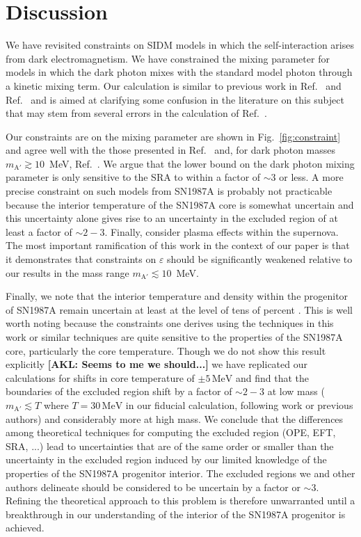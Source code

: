 \documentclass[nofootinbib,prd,superscriptaddress,twocolumn]{revtex4}
\newcommand{\akl}[1]{{{\bf{\color{Red}[AKL: #1]}}}}
\begin{document}
\section{Discussion}
\label{section:conclusions}


We have revisited constraints on SIDM models in which the 
self-interaction arises from dark electromagnetism. We have 
constrained the mixing parameter for models in which the dark photon 
mixes with the standard model photon through a kinetic mixing term. Our calculation 
is similar to previous work in Ref.~\cite{dent_etal12} and Ref.~\cite{rrapaj_reddy16} and 
is aimed at clarifying some confusion in the literature on this subject that may stem 
from several errors in the calculation of Ref.~\cite{dent_etal12}.

Our constraints are on the mixing parameter are shown in 
Fig.~\ref{fig:constraint} and agree well with the those presented in 
Ref.~\cite{rrapaj_reddy16} and, for dark photon masses $m_{\mathrm{A}'} \gtrsim 10$~MeV, 
Ref.~\cite{hardy_lasenby17}. We argue that the lower bound on the dark photon mixing parameter 
is only sensitive to the SRA to within a factor of $\sim 3$ or less. A more precise constraint 
on such models from SN1987A is probably not practicable because the interior temperature 
of the SN1987A core is somewhat uncertain and this uncertainty alone gives rise to an uncertainty 
in the excluded region of at least a factor of $\sim 2-3$. Finally, \citet{hardy_lasenby17} consider 
plasma effects within the supernova. The most important ramification of this work in the context of 
our paper is that it demonstrates that constraints on $\varepsilon$ should be significantly weakened 
relative to our results in the mass range $m_{\mathrm{A}'} \lesssim 10$~MeV.

Finally, we note that the interior temperature and density within the progenitor of SN1987A remain 
uncertain at least at the level of tens of percent \citep[e.g.][]{perego15,farmer16}. This is well worth 
noting because the constraints one derives using the techniques in this work or similar techniques 
are quite sensitive to the properties of the SN1987A core, particularly the core temperature. Though 
we do not show this result explicitly \akl{Seems to me we should...} 
we have replicated our calculations for shifts in core temperature 
of $\pm 5\, \mathrm{MeV}$ and find that the boundaries of the excluded region shift by a factor of $\sim 2-3$ at low 
mass ($m_{\mathrm{A}'} \lesssim T$ where $T = 30\, \mathrm{MeV}$ in our fiducial calculation, following 
work or previous authors) and considerably more at high mass. 
We conclude that the differences among theoretical techniques for 
computing the excluded region (OPE, EFT, SRA, ...) lead to uncertainties that are of the same order or 
smaller than the uncertainty in the excluded region induced by our limited knowledge of the 
properties of the SN1987A progenitor interior. The excluded regions we and other authors delineate 
should be considered to be uncertain by a factor or $\sim 3$. Refining the theoretical approach to this 
problem is therefore unwarranted until a breakthrough in our understanding of the interior of the 
SN1987A progenitor is achieved.
\end{document}

